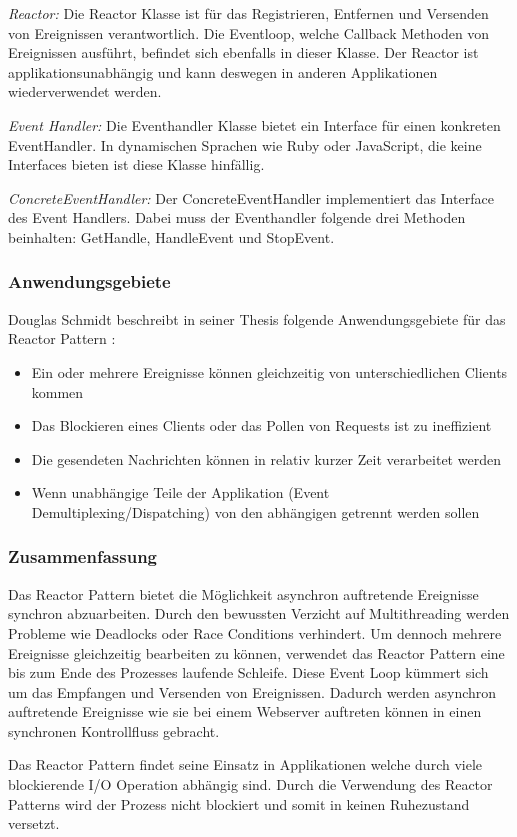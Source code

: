 \cite[p. 2]{Sch95}

\emph{Reactor:}
 Die Reactor Klasse ist für das Registrieren, Entfernen und Versenden von Ereignissen verantwortlich. Die Eventloop, welche Callback Methoden von Ereignissen ausführt, befindet sich ebenfalls in dieser Klasse. Der Reactor ist applikationsunabhängig und kann deswegen in anderen Applikationen wiederverwendet werden. 

\emph{Event Handler:}
Die Eventhandler Klasse bietet ein Interface für einen konkreten EventHandler. In dynamischen Sprachen wie Ruby oder JavaScript, die keine Interfaces bieten ist diese Klasse hinfällig. 

\emph{ConcreteEventHandler:}
Der ConcreteEventHandler implementiert das Interface des Event Handlers. Dabei muss der Eventhandler folgende drei Methoden beinhalten: GetHandle, HandleEvent und StopEvent.

\subsubsection{Anwendungsgebiete}

Douglas Schmidt beschreibt in seiner Thesis folgende Anwendungsgebiete für das Reactor Pattern \cite[p. 4]{Sch95}:

\begin{itemize}
  \item Ein oder mehrere Ereignisse können gleichzeitig von unterschiedlichen Clients kommen
  \item Das Blockieren eines Clients oder das Pollen von Requests ist zu ineffizient
  \item Die gesendeten Nachrichten können in relativ kurzer Zeit verarbeitet werden
  \item Wenn unabhängige Teile der Applikation (Event Demultiplexing/Dispatching) von den abhängigen getrennt werden sollen
\end{itemize}

\subsubsection{Zusammenfassung}

Das Reactor Pattern bietet die Möglichkeit asynchron auftretende Ereignisse synchron abzuarbeiten. Durch den bewussten Verzicht auf Multithreading werden Probleme wie Deadlocks oder Race Conditions verhindert. Um dennoch mehrere Ereignisse gleichzeitig bearbeiten zu können, verwendet das Reactor Pattern eine bis zum Ende des Prozesses laufende Schleife. Diese Event Loop kümmert sich um das Empfangen und Versenden von Ereignissen. Dadurch werden asynchron auftretende Ereignisse wie sie bei einem Webserver auftreten können in einen synchronen Kontrollfluss gebracht. 

Das Reactor Pattern findet seine Einsatz in Applikationen welche durch viele blockierende I/O Operation abhängig sind. Durch die Verwendung des Reactor Patterns wird der Prozess nicht blockiert und somit in keinen Ruhezustand versetzt.